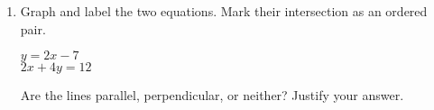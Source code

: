 \documentclass[12pt, twoside]{article}
\begin{document}
\begin{enumerate}
  \item Graph and label the two equations. Mark their intersection as an ordered pair.

    \begin{multicols}{2}
      $y = 2x-7$ \\
      $2x+4y = 12$
    \end{multicols}
    Are the lines parallel, perpendicular, or neither? Justify your answer.
    \vspace{1.cm}

    \begin{center} %
    \end{center}

  \end{enumerate}

  
\end{document}
